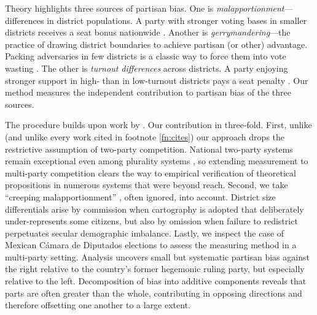 \documentclass[letter,12pt]{article}
\begin{document}
Theory highlights three sources of partisan bias. One is \emph{malapportionment}---differences in district populations. A party with stronger voting bases in smaller districts receives a seat bonus nationwide \citep{johnston.2002,jackmanMeasuringBias1994}. Another is \emph{gerrymandering}---the practice of drawing district boundaries to achieve partisan (or other) advantage. Packing adversaries in few districts is a classic way to force them into vote wasting \citep{cox.katz.2002,engstrom2006redisttrictApsr}. The other is \emph{turnout differences} across districts. A party enjoying stronger support in high- than in low-turnout districts pays a seat penalty \citep{campbellTurnoutBias1996,rosenstone.hansen.1993}. Our method measures the independent contribution to partisan bias of the three sources. 

The procedure builds upon work by \citet{grofman.etalBiasMalapp.1997}. Our contribution in three-fold. First, unlike \citeauthor{grofman.etalBiasMalapp.1997} (and unlike every work cited in footnote \ref{fn:cites}) our approach drops the restrictive assumption of two-party competition. National two-party systems remain exceptional even among plurality systems \citep{cox.1997}, so extending measurement to multi-party competition clears the way to empirical verification of theoretical propositions in numerous systems that were beyond reach. Second, we take ``creeping malapportionment'' \citep{johnston.2002}, often ignored, into account. District size differentials arise by commission when cartography is adopted that deliberately under-represents some citizens, but also by omission when failure to redistrict perpetuates secular demographic imbalance. Lastly, we inspect the case of Mexican C\'amara de Diputados elections to assess the measuring method in a multi-party setting. Analysis uncovers small but systematic partisan bias against the right relative to the country's former hegemonic ruling party, but especially relative to the left. Decomposition of bias into additive components reveals that parts are often greater than the whole, contributing in opposing directions and therefore offsetting one another to a large extent. 
\end{document}

